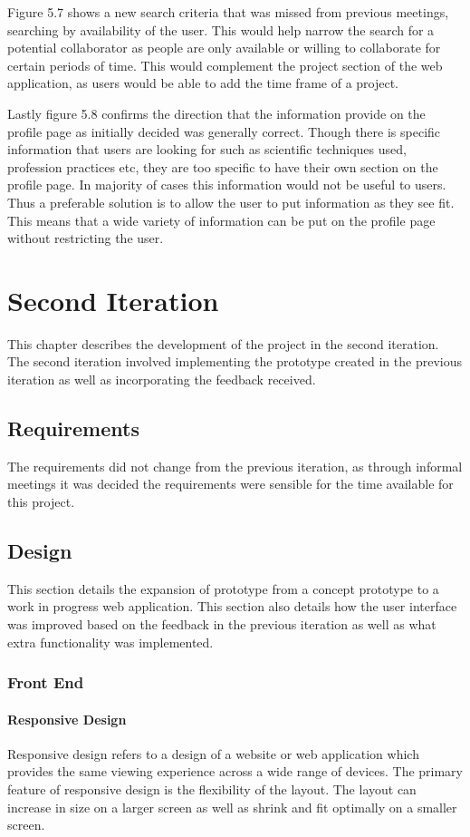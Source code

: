 \documentclass[a4paper,oneside,11pt]{report}
\begin{document}
Figure 5.7 shows a new search criteria that was missed from previous meetings, searching by availability of the user. This would help narrow the search for a potential collaborator as people are only available or willing to collaborate for certain periods of time. This would complement the project section of the web application, as users would be able to add the time frame of a project.

Lastly figure 5.8 confirms the direction that the information provide on the profile page as initially decided was generally correct. Though there is specific information that users are looking for such as scientific techniques used, profession practices etc, they are too specific to have their own section on the profile page. In majority of cases this information would not be useful to users. Thus a preferable solution is to allow the user to put information as they see fit. This means that a wide variety of information can be put on the profile page without restricting the user.
\chapter{Second Iteration}
This chapter describes the development of the project in the second iteration. The second iteration involved implementing the prototype created in the previous iteration as well as incorporating the feedback received.
\section{Requirements}
The requirements did not change from the previous iteration, as through informal meetings it was decided the requirements were sensible for the time available for this project.
\section{Design}
This section details the expansion of prototype from a concept prototype to a work in progress web application. This section also details how the user interface was improved based on the feedback in the previous iteration as well as what extra functionality was implemented.
\subsection{Front End}
\pagebreak

\subsubsection{Responsive Design}
Responsive design refers to a design of a website or web application which provides the same viewing experience across a wide range of devices. The primary feature of responsive design is the flexibility of the layout. The layout can increase in size on a larger screen as well as shrink and fit optimally on a smaller screen.
\end{document}
